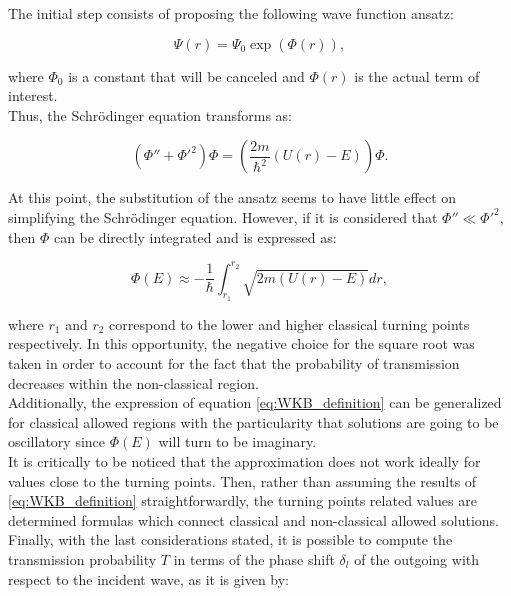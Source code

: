 \documentclass[openany]{book}
\begin{document}
The initial step consists of proposing the following wave function ansatz: 

\begin{equation} \label{eq:WKB_ansatz}
	\Psi(r) = \Psi_0\exp{(\Phi(r))},
\end{equation}

where $\Phi_0$ is a constant that will be canceled and $\Phi(r)$ is the actual term of interest. \\

Thus, the Schrödinger equation transforms as: 

\begin{equation} \label{eq:WKB_schrodinger}
	\left(\Phi'' + \Phi'^{2} \right)\Phi = \left(\frac{2m}{\hbar^2} (U(r) - E)\right) \Phi.
\end{equation}

At this point, the substitution of the ansatz seems to have little effect on simplifying the Schrödinger equation. However,  if it is considered that $\Phi'' \ll \Phi'^{2}$, then $\Phi$ can be directly integrated and is expressed as:

\begin{equation} \label{eq:WKB_definition}
	\Phi(E) \approx -\frac{1}{\hbar}\int_{r_1}^{r_2} {\sqrt{2m(U(r)-E)}} dr,
\end{equation}

where $r_1$ and $r_2$ correspond to the lower and higher classical turning points respectively. In this opportunity, the negative choice for the square root was taken in order to account for the fact that the probability of transmission decreases within the non-classical region. \\

Additionally, the expression of equation \ref{eq:WKB_definition} can be generalized for classical allowed regions with the particularity that solutions are going to be oscillatory since $\Phi(E)$ will turn to be imaginary. \\

It is critically to be noticed that the approximation does not work ideally for values close to the turning points. Then, rather than assuming the results of \ref{eq:WKB_definition} straightforwardly, the turning points related values are determined formulas which connect classical and non-classical allowed solutions. \\

Finally, with the last considerations stated, it is possible to compute the transmission probability $T$ in terms of the phase shift $\delta_l$ of the outgoing with respect to the incident wave, as it  is given by: 
 
\end{document}
